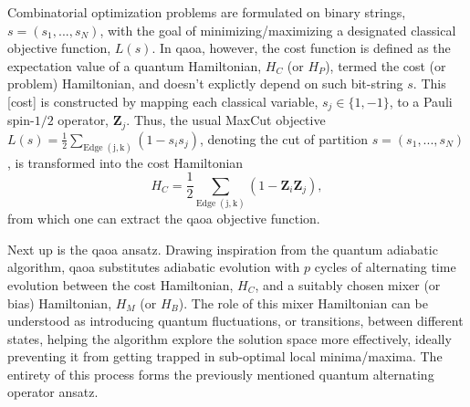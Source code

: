 Combinatorial optimization problems are formulated on binary strings, $s = (s_1,...,s_N)$, with the goal of minimizing/maximizing a designated classical objective function, $L(s)$. In \acrshort{qaoa}, however, the cost function is defined as the expectation value of a quantum Hamiltonian, $H_C$ (or $H_P$), termed the cost (or problem) Hamiltonian, and doesn't explictly depend on such bit-string $s$. This [cost] is constructed by mapping each classical variable, $s_j \in \{1, -1\}$, to a Pauli spin-$1/2$ operator, $\boldsymbol{Z}_j$. Thus, the usual MaxCut objective $L(s) = \frac{1}{2}\sum_{\mathrm{Edge}\;(\mathrm{j,k})}(1-s_{i}s_{j})$, denoting the cut of partition $s = (s_1,...,s_N)$, is transformed into the cost Hamiltonian
\begin{equation}\label{eq:H_C}
  H_C = \frac{1}{2}\sum_{\mathrm{Edge}\;(\mathrm{j,k})}(1-\boldsymbol{Z}_i\boldsymbol{Z}_j),
\end{equation}
from which one can extract the \acrshort{qaoa} objective function.

Next up is the \acrshort{qaoa} ansatz. Drawing inspiration from the quantum adiabatic algorithm, \acrshort{qaoa} substitutes adiabatic evolution with $p$ cycles of alternating time evolution between the cost Hamiltonian, $H_C$, and a suitably chosen mixer (or bias) Hamiltonian, $H_M$ (or $H_B$). The role of this mixer Hamiltonian can be understood as introducing quantum fluctuations, or transitions, between different states, helping the algorithm explore the solution space more effectively, ideally preventing it from getting trapped in sub-optimal local minima/maxima. The entirety of this process forms the previously mentioned quantum alternating operator ansatz.

